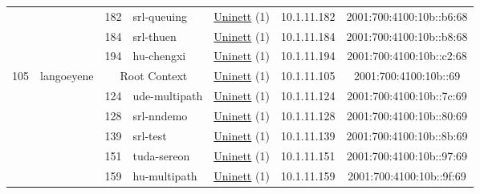 \begin{small}
\begin{center}
\begin{longtable}{|c|c|c|c|c|c|c|c|}
  &  & \tiny{182} & \multicolumn{1}{|l|}{\tiny{srl-queuing}} & \multicolumn{2}{|c|}{\tiny{\href{https://www.uninett.no}{Uninett} (1)}} & \tiny{10.1.11.182} & \tiny{2001:700:4100:10b::b6:68} \\* \cline{3-3}\cline{4-4}\cline{5-5}\cline{6-6}\cline{7-7}\cline{8-8}
  &  & \tiny{184} & \multicolumn{1}{|l|}{\tiny{srl-thuen}} & \multicolumn{2}{|c|}{\tiny{\href{https://www.uninett.no}{Uninett} (1)}} & \tiny{10.1.11.184} & \tiny{2001:700:4100:10b::b8:68} \\* \cline{3-3}\cline{4-4}\cline{5-5}\cline{6-6}\cline{7-7}\cline{8-8}
  &  & \tiny{194} & \multicolumn{1}{|l|}{\tiny{hu-chengxi}} & \multicolumn{2}{|c|}{\tiny{\href{https://www.uninett.no}{Uninett} (1)}} & \tiny{10.1.11.194} & \tiny{2001:700:4100:10b::c2:68} \\ \hline
 \multirow{11}{*}{\tiny{105}} & \multicolumn{1}{|l|}{\multirow{11}{*}{\tiny{langoeyene}}} & \multicolumn{2}{|c|}{\tiny{Root Context}} & \multicolumn{2}{|c|}{\tiny{\href{https://www.uninett.no}{Uninett} (1)}} & \tiny{10.1.11.105} & \tiny{2001:700:4100:10b::69} \\* \cline{3-3}\cline{4-4}\cline{5-5}\cline{6-6}\cline{7-7}\cline{8-8}
  &  & \tiny{124} & \multicolumn{1}{|l|}{\tiny{ude-multipath}} & \multicolumn{2}{|c|}{\tiny{\href{https://www.uninett.no}{Uninett} (1)}} & \tiny{10.1.11.124} & \tiny{2001:700:4100:10b::7c:69} \\* \cline{3-3}\cline{4-4}\cline{5-5}\cline{6-6}\cline{7-7}\cline{8-8}
  &  & \tiny{128} & \multicolumn{1}{|l|}{\tiny{srl-nndemo}} & \multicolumn{2}{|c|}{\tiny{\href{https://www.uninett.no}{Uninett} (1)}} & \tiny{10.1.11.128} & \tiny{2001:700:4100:10b::80:69} \\* \cline{3-3}\cline{4-4}\cline{5-5}\cline{6-6}\cline{7-7}\cline{8-8}
  &  & \tiny{139} & \multicolumn{1}{|l|}{\tiny{srl-test}} & \multicolumn{2}{|c|}{\tiny{\href{https://www.uninett.no}{Uninett} (1)}} & \tiny{10.1.11.139} & \tiny{2001:700:4100:10b::8b:69} \\* \cline{3-3}\cline{4-4}\cline{5-5}\cline{6-6}\cline{7-7}\cline{8-8}
  &  & \tiny{151} & \multicolumn{1}{|l|}{\tiny{tuda-sereon}} & \multicolumn{2}{|c|}{\tiny{\href{https://www.uninett.no}{Uninett} (1)}} & \tiny{10.1.11.151} & \tiny{2001:700:4100:10b::97:69} \\* \cline{3-3}\cline{4-4}\cline{5-5}\cline{6-6}\cline{7-7}\cline{8-8}
  &  & \tiny{159} & \multicolumn{1}{|l|}{\tiny{hu-multipath}} & \multicolumn{2}{|c|}{\tiny{\href{https://www.uninett.no}{Uninett} (1)}} & \tiny{10.1.11.159} & \tiny{2001:700:4100:10b::9f:69} \\* \cline{3-3}\cline{4-4}\cline{5-5}\cline{6-6}\cline{7-7}\cline{8-8}

\end{longtable}
\end{center}
\end{small}
